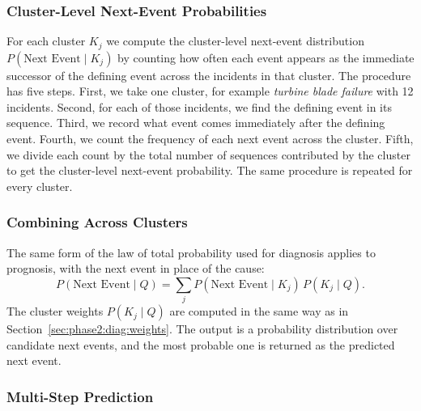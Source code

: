 \documentclass[11pt]{article}
\begin{document}
\subsubsection{Cluster-Level Next-Event Probabilities}
\label{sec:phase2:prog:cluster}

For each cluster $K_j$ we compute the cluster-level next-event distribution $P(\text{Next Event} \mid K_j)$ by counting how often each event appears as the immediate successor of the defining event across the incidents in that cluster. The procedure has five steps. First, we take one cluster, for example \emph{turbine blade failure} with 12 incidents. Second, for each of those incidents, we find the defining event in its sequence. Third, we record what event comes immediately after the defining event. Fourth, we count the frequency of each next event across the cluster. Fifth, we divide each count by the total number of sequences contributed by the cluster to get the cluster-level next-event probability. The same procedure is repeated for every cluster.

\subsubsection{Combining Across Clusters}
\label{sec:phase2:prog:lotp}

The same form of the law of total probability used for diagnosis applies to prognosis, with the next event in place of the cause:
\begin{equation}
P(\text{Next Event} \mid Q) = \sum_{j} P(\text{Next Event} \mid K_j) \, P(K_j \mid Q).
\label{eq:prog_lotp}
\end{equation}
The cluster weights $P(K_j \mid Q)$ are computed in the same way as in Section~\ref{sec:phase2:diag:weights}. The output is a probability distribution over candidate next events, and the most probable one is returned as the predicted next event.

\subsubsection{Multi-Step Prediction}
\label{sec:phase2:prog:multi}
\end{document}

